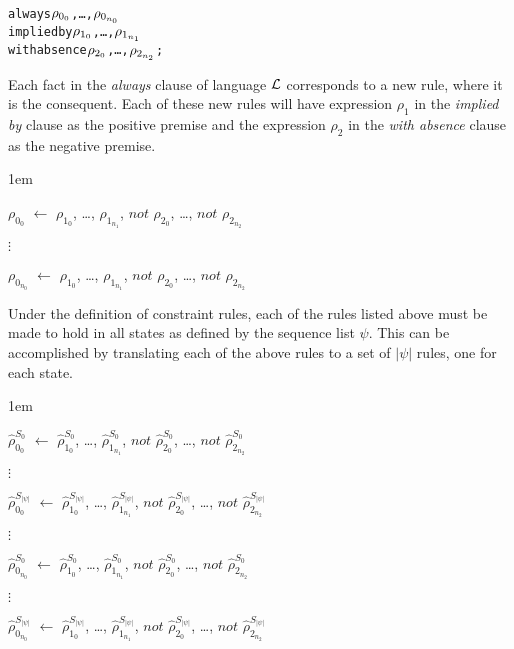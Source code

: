 \documentclass[11pt]{report}
\newenvironment{vverbatim}
{
  \begin{alltt}
}
{
    \vspace{-\baselineskip}
  \end{alltt}
}
\newenvironment{vquote}
{
  \begin{list}{}{\leftmargin 1em}\item[]
}
{
  \end{list}
}
\begin{document}
          \begin{vverbatim}
  always \(\rho\sb{0\sb{0}}\), \ldots, \(\rho\sb{0\sb{n\sb{0}}}\)
    implied by \(\rho\sb{1\sb{0}}\), \ldots, \(\rho\sb{1\sb{n\sb{1}}}\)
    with absence \(\rho\sb{2\sb{0}}\), \ldots, \(\rho\sb{2\sb{n\sb{2}}}\);
          \end{vverbatim}

          Each fact in the {\em always} clause of language ${\cal L}$
          corresponds to a new rule, where it is the consequent. Each of
          these new rules will have expression $\rho_{1}$ in the
          {\em implied by} clause as the positive premise and the expression
          $\rho_{2}$ in the {\em with absence} clause as the negative
          premise.

          \begin{vquote}
            $\rho_{0_{0}}$ $\leftarrow$
              $\rho_{1_{0}}$, \ldots, $\rho_{1_{n_1}}$,
              $not$ $\rho_{2_{0}}$, \ldots, $not$ $\rho_{2_{n_2}}$

            $\vdots$

            $\rho_{0_{n_{0}}}$ $\leftarrow$
              $\rho_{1_{0}}$, \ldots, $\rho_{1_{n_1}}$,
              $not$ $\rho_{2_{0}}$, \ldots, $not$ $\rho_{2_{n_2}}$
          \end{vquote}

          Under the definition of constraint rules, each of the rules listed
          above must be made to hold in all states as defined by the sequence
          list $\psi$. This can be accomplished by translating each of the
          above rules to a set of $|\psi|$ rules, one for each state.

          \begin{vquote}
            $\hat{\rho}^{S_{0}}_{0_{0}}$ $\leftarrow$
              $\hat{\rho}^{S_{0}}_{1_{0}}$, \ldots,
                $\hat{\rho}^{S_{0}}_{1_{n_1}}$,
              $not$ $\hat{\rho}^{S_{0}}_{2_{0}}$, \ldots,
                $not$ $\hat{\rho}^{S_{0}}_{2_{n_2}}$

            $\vdots$

            $\hat{\rho}^{S_{|\psi|}}_{0_{0}}$ $\leftarrow$
              $\hat{\rho}^{S_{|\psi|}}_{1_{0}}$, \ldots,
                $\hat{\rho}^{S_{|\psi|}}_{1_{n_1}}$,
              $not$ $\hat{\rho}^{S_{|\psi|}}_{2_{0}}$, \ldots,
                $not$ $\hat{\rho}^{S_{|\psi|}}_{2_{n_2}}$

            $\vdots$

            $\hat{\rho}^{S_{0}}_{0_{n_0}}$ $\leftarrow$
              $\hat{\rho}^{S_{0}}_{1_{0}}$, \ldots,
                $\hat{\rho}^{S_{0}}_{1_{n_1}}$,
              $not$ $\hat{\rho}^{S_{0}}_{2_{0}}$, \ldots,
                $not$ $\hat{\rho}^{S_{0}}_{2_{n_2}}$

            $\vdots$

            $\hat{\rho}^{S_{|\psi|}}_{0_{n_0}}$ $\leftarrow$
              $\hat{\rho}^{S_{|\psi|}}_{1_{0}}$, \ldots,
                $\hat{\rho}^{S_{|\psi|}}_{1_{n_1}}$,
              $not$ $\hat{\rho}^{S_{|\psi|}}_{2_{0}}$, \ldots,
                $not$ $\hat{\rho}^{S_{|\psi|}}_{2_{n_2}}$
          \end{vquote}
\end{document}

